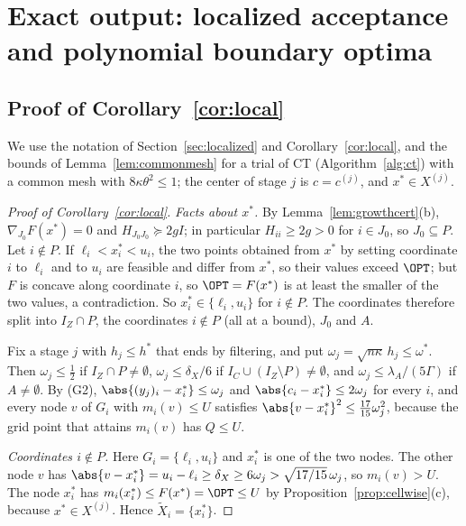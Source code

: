 \section{Exact output: localized acceptance and polynomial boundary optima}\label{app:exact}

\subsection{Proof of Corollary~\ref{cor:local}}\label{app:localized}
We use the notation of Section~\ref{sec:localized} and
Corollary~\ref{cor:local}, and the bounds of Lemma~\ref{lem:commonmesh} for a
trial of CT (Algorithm~\ref{alg:ct}) with a common mesh with
$8\kappa\theta^2\le1$; the center of stage $j$ is $c=c^{(j)}$, and
$x^*\in X^{(j)}$.

\begin{proof}[Proof of Corollary~\ref{cor:local}]
\emph{Facts about $x^*$.} By Lemma~\ref{lem:growthcert}(b),
$\nabla_{J_0}F(x^*)=0$ and $H_{J_0J_0}\succeq2gI$; in particular
$H_{ii}\ge2g>0$ for $i\in J_0$, so $J_0\subseteq P$. Let $i\notin P$. If
$\ell_i<x^*_i<u_i$, the two points obtained from $x^*$ by setting coordinate
$i$ to $\ell_i$ and to $u_i$ are feasible and differ from $x^*$, so their
values exceed $\OPT$; but $F$ is
concave along coordinate $i$, so $\OPT=F(x^*)$ is at least the smaller of the
two values, a contradiction. So $x^*_i\in\{\ell_i,u_i\}$ for $i\notin P$. The
coordinates therefore split into $I_Z\cap P$, the coordinates $i\notin P$
(all at a bound), $J_0$ and $A$.

Fix a stage $j$ with $h_j\le h^*$ that ends by filtering, and put
$\omega_j=\sqrt{n\kappa}\,h_j\le\omega^*$. Then $\omega_j\le\frac12$ if
$I_Z\cap P\ne\emptyset$,
$\omega_j\le\delta_X/6$ if $I_C\cup(I_Z\setminus P)\ne\emptyset$, and
$\omega_j\le\lambda_A/(5\Gamma)$ if $A\ne\emptyset$. By (G2),
$\abs{(y_j)_i-x^*_i}\le\omega_j$ and $\abs{c_i-x^*_i}\le2\omega_j$ for every $i$, and
every node $v$ of $G_i$ with $m_i(v)\le U$ satisfies
$\abs{v-x^*_i}^2\le\frac{17}{15}\omega_j^2$, because the grid point that attains
$m_i(v)$ has $Q\le U$.

\emph{Coordinates $i\notin P$.} Here $G_i=\{\ell_i,u_i\}$ and $x^*_i$ is one
of the two nodes. The other node $v$ has
$\abs{v-x^*_i}=u_i-\ell_i\ge\delta_X\ge6\omega_j>\sqrt{17/15}\,\omega_j$, so
$m_i(v)>U$. The node $x^*_i$ has $m_i(x^*_i)\le F(x^*)=\OPT\le U$ by
Proposition~\ref{prop:cellwise}(c), because $x^*\in X^{(j)}$. Hence
$\tilde X_i=\{x^*_i\}$.


\end{proof}
